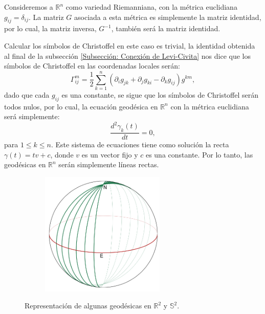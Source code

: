 \begin{example}
	Consideremos a $\mathbb{R}^{n}$ como variedad Riemanniana, con la métrica euclidiana $g_{ij} = \delta_{ij}$. La matriz $G$ asociada a esta métrica es simplemente la matriz identidad, por lo cual, la matriz inversa, $G^{-1}$, también será la matriz identidad.

	Calcular los símbolos de Christoffel en este caso es trivial, la identidad obtenida al final de la subsección \ref{Subsección: Conexión de Levi-Civita} nos dice que los símbolos de Christoffel en las coordenadas locales serán:
	\[
		\Gamma_{ij}^{m} = \frac{1}{2} \sum_{k=1}^{n}  (\partial_{i}g_{jk} + \partial_{j}g_{ki} - \partial_{k}g_{ij}) g^{km},
	\]
	dado que cada $g_{ij}$ es una constante, se sigue que los símbolos de Christoffel serán todos nulos, por lo cual, la ecuación geodésica en $\mathbb{R}^n$ con la métrica euclidiana será simplemente:
	\[
		\frac{d^{2}\gamma_k(t)}{dt} = 0,
	\]
	para $1 \leq k \leq n$. Este sistema de ecuaciones tiene como solución la recta $\gamma(t) = tv + c$, donde $v$ es un vector fijo y $c$ es una constante. Por lo tanto, las geodésicas en $\mathbb{R}^n$ serán simplemente líneas rectas.
\end{example}

\begin{center}
	\begin{figure}[h]
		\centering
		\begin{subfigure}{0.45\textwidth}
			\centering
			
		\end{subfigure}
		\begin{subfigure}{0.5\textwidth}
			\centering
			\includegraphics[width=0.65\textwidth]{Figuras/A-Figuras/GeodesicasEsfera.png}
		\end{subfigure}
    \caption{Representación de algunas geodésicas en $\mathbb{R}^{2}$ y $\mathbb{S}^{2}$.}
	\end{figure}
\end{center}
